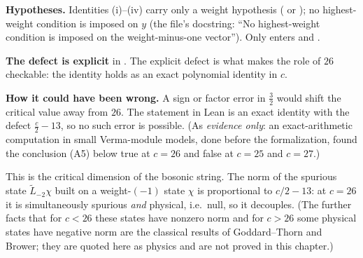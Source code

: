 \begin{dictionary}
\textbf{Hypotheses.}  Identities (i)--(iv) carry only a weight hypothesis ( or
); no highest-weight condition is imposed on $y$ (the file's docstring: ``No
highest-weight condition is imposed on the weight-minus-one vector'').  Only 
enters  and .

\textbf{The defect is explicit} in .  The explicit defect is what makes the role of $26$
checkable: the identity holds as an exact polynomial identity in $c$.

\textbf{How it could have been wrong.}  A sign or factor error in $\frac32$ would shift the critical
value away from $26$.  The statement in Lean is an exact identity with the defect $\frac c2-13$, so no such error is possible.
(As \emph{evidence only}: an exact-arithmetic computation in small Verma-module models, done before the formalization,
found the conclusion (A5) below true at $c=26$ and false at $c=25$ and $c=27$.)
\end{dictionary}
\begin{physics}
This is the critical dimension of the bosonic string.  The norm of the spurious state
$\widetilde L_{-2}\chi$ built on a weight-$(-1)$ state $\chi$ is proportional to $c/2-13$: at $c=26$ it is
simultaneously spurious \emph{and} physical, i.e.\ null, so it decouples.  (The further facts that for $c<26$ these states
have nonzero norm and for $c>26$ some physical states have negative norm are the classical results of Goddard--Thorn and
Brower; they are quoted here as physics and are not proved in this chapter.)
\end{physics}

